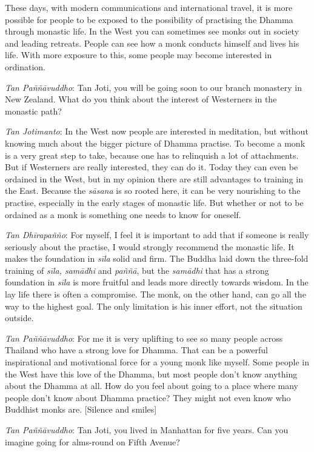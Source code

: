 These days, with modern communications and international travel, it is
more possible for people to be exposed to the possibility of practising
the Dhamma through monastic life. In the West you can sometimes see
monks out in society and leading retreats. People can see how a monk
conducts himself and lives his life. With more exposure to this, some
people may become interested in ordination. 

\emph{Tan Paññāvuddho}: Tan Joti, you will be going soon to our branch
monastery in New Zealand. What do you think about the interest of
Westerners in the monastic path? 

\emph{Tan Jotimanto}: In the West now people are interested in
meditation, but without knowing much about the bigger picture of Dhamma
practise. To become a monk is a very great step to take, because one has
to relinquish a lot of attachments. But if Westerners are really
interested, they can do it. Today they can even be ordained in the West, 
but in my opinion there are still advantages to training in the East. 
Because the \emph{sāsana} is so rooted here, it can be very nourishing
to the practise, especially in the early stages of monastic life. But
whether or not to be ordained as a monk is something one needs to know
for oneself. 

\emph{Tan Dhīrapañño}: For myself, I feel it is important to add that
if someone is really seriously about the practise, I would strongly
recommend the monastic life. It makes the foundation in \emph{sīla}
solid and firm. The Buddha laid down the three-fold training of
\emph{sīla, samādhi} and \emph{paññā}, but the \emph{samādhi} that has a
strong foundation in \emph{sīla} is more fruitful and leads more
directly towards wisdom. In the lay life there is often a compromise. 
The monk, on the other hand, can go all the way to the highest goal. The
only limitation is his inner effort, not the situation outside. 

\emph{Tan Paññāvuddho}: For me it is very uplifting to see so many
people across Thailand who have a strong love for Dhamma. That can be a
powerful inspirational and motivational force for a young monk like
myself. Some people in the West have this love of the Dhamma, but most
people don't know anything about the Dhamma at all. How do you feel
about going to a place where many people don't know about Dhamma
practice? They might not even know who Buddhist monks are. [Silence and smiles]

\emph{Tan Paññāvuddho}: Tan Joti, you lived in Manhattan for five
years. Can you imagine going for alms-round on Fifth Avenue? 


